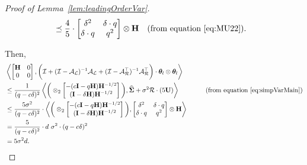 \begin{proof}[Proof of Lemma~\ref{lem:leadingOrderVar}]
\begin{align*}
&\preceq \frac{4}{5}\cdot\begin{bmatrix}\delta^2&\delta\cdot q \\\delta\cdot q &q ^2\end{bmatrix}\otimes \mathbf{H}\quad(\text{from equation}~\ref{eq:MU22}).
\end{align*}
\iffalse
This implies,
\begin{align*}
\RT\phiv_{\infty}&\preceq 5\sigma^2 \RT\U \preceq 4\sigma^2\begin{bmatrix}\delta^2&\delta\cdot \g \\\delta\cdot \g &\g ^2\end{bmatrix}\otimes \H.
\end{align*}
\fi
Then,
\begin{align}
&\left\langle \begin{bmatrix}\mathbf{H}&0\\0&0\end{bmatrix}, \bigg(\mathcal{I}+(\mathcal{I}-\mathcal{A}_{\mathcal{L}})^{-1}\mathcal{A}_{\mathcal{L}}+(\mathcal{I}-\mathcal{A}_{\mathcal{R}}^{\top})^{-1}\mathcal{A}_{\mathcal{R}}^{\top}\bigg)\cdot\boldsymbol{\theta}_{l}\otimes\boldsymbol{\theta}_{l} \right\rangle\nonumber\\
&\leq\frac{1}{(q -c\delta)^2}\left\langle \bigg(\otimes_2\begin{bmatrix} -(c\mathbf{I}-q \mathbf{H})\mathbf{H}^{-1/2}\\(\mathbf{I}-\delta\mathbf{H})\mathbf{H}^{-1/2}\end{bmatrix}\bigg), \mathbf{\widehat{\Sigma}}+\sigma^2\mathcal{R}\cdot(5\mathbf{U}) \right\rangle\qquad\qquad(\text{from equation}~\ref{eq:simpVarMain})\nonumber\\
&\leq\frac{5\sigma^2}{(q -c\delta)^2} \cdot \left\langle \bigg(\otimes_2\begin{bmatrix} -(c\mathbf{I}-q \mathbf{H})\mathbf{H}^{-1/2}\\(\mathbf{I}-\delta\mathbf{H})\mathbf{H}^{-1/2}\end{bmatrix}\bigg), \begin{bmatrix}\delta^2&\delta\cdot q \\\delta\cdot q &q ^2\end{bmatrix}\otimes \mathbf{H} \right\rangle\nonumber\\
&=\frac{5}{(q -c\delta)^2} \cdot d\ \sigma^2\cdot (q-c\delta)^2\nonumber\\
&=5\sigma^2d.
\end{align}
\end{proof}
